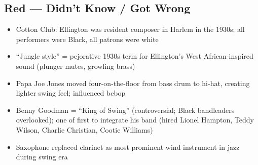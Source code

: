 \documentclass[11pt, letterpaper]{article}
\begin{document}
\subsection*{\textcolor{redzone}{Red --- Didn't Know / Got Wrong}}
\begin{itemize}[label=$\square$]
    \item Cotton Club: Ellington was resident composer in Harlem in the 1930s; all performers were Black, all patrons were white
    \item ``Jungle style'' = pejorative 1930s term for Ellington's West African-inspired sound (plunger mutes, growling brass)
    \item Papa Joe Jones moved four-on-the-floor from bass drum to hi-hat, creating lighter swing feel; influenced bebop
    \item Benny Goodman = ``King of Swing'' (controversial; Black bandleaders overlooked); one of first to integrate his band (hired Lionel Hampton, Teddy Wilson, Charlie Christian, Cootie Williams)
    \item Saxophone replaced clarinet as most prominent wind instrument in jazz during swing era
\end{itemize}
\end{document}
